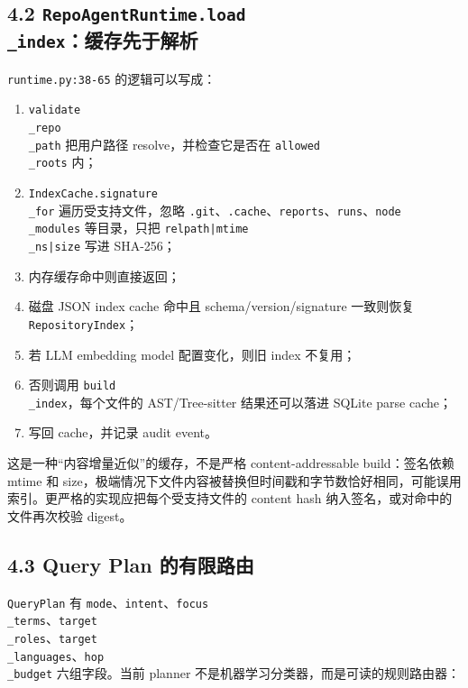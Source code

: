 \documentclass[UTF8,12pt,openany]{ctexbook}
\begin{document}
\subsection{4.2 \texttt{RepoAgentRuntime.load\\_index}：缓存先于解析}

\texttt{runtime.py:38-65} 的逻辑可以写成：\par

\begin{enumerate}
\item \texttt{validate\\_repo\\_path} 把用户路径 resolve，并检查它是否在 \texttt{allowed\\_roots} 内；
\item \texttt{IndexCache.signature\\_for} 遍历受支持文件，忽略 \texttt{.git}、\texttt{.cache}、\texttt{reports}、\texttt{runs}、\texttt{node\\_modules} 等目录，只把 \texttt{relpath|mtime\\_ns|size} 写进 SHA-256；
\item 内存缓存命中则直接返回；
\item 磁盘 JSON index cache 命中且 schema/version/signature 一致则恢复 \texttt{RepositoryIndex}；
\item 若 LLM embedding model 配置变化，则旧 index 不复用；
\item 否则调用 \texttt{build\\_index}，每个文件的 AST/Tree-sitter 结果还可以落进 SQLite parse cache；
\item 写回 cache，并记录 audit event。
\end{enumerate}

这是一种“内容增量近似”的缓存，不是严格 content-addressable build：签名依赖 mtime 和 size，极端情况下文件内容被替换但时间戳和字节数恰好相同，可能误用索引。更严格的实现应把每个受支持文件的 content hash 纳入签名，或对命中的文件再次校验 digest。\par

\subsection{4.3 Query Plan 的有限路由}

\texttt{QueryPlan} 有 \texttt{mode}、\texttt{intent}、\texttt{focus\\_terms}、\texttt{target\\_roles}、\texttt{target\\_languages}、\texttt{hop\\_budget} 六组字段。当前 planner 不是机器学习分类器，而是可读的规则路由器：\par
\end{document}
